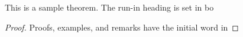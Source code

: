 \documentclass[runningheads]{llncs}
\begin{document}
\begin{theorem}
This is a sample theorem. The run-in heading is set in bo
\end{theorem}
%
%
\begin{proof}
Proofs, examples, and remarks have the initial word in 
\end{proof}
%
%
%


%




\end{document}
